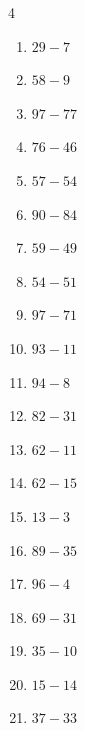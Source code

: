 \begin{multicols}{4}
\begin{enumerate}
  \item $29-7$
        \phantom{$=22$}

  \item $58-9$
        \phantom{$=49$}

\columnbreak %

\resetques

  \item $97-77$
        \phantom{$=20$}

  \item $76-46$
        \phantom{$=30$}

  \item $57-54$
        \phantom{$=3$}

  \item $90-84$
        \phantom{$=6$}

  \item $59-49$
        \phantom{$=10$}

  \item $54-51$
        \phantom{$=3$}

  \item $97-71$
        \phantom{$=26$}

  \item $93-11$
        \phantom{$=82$}

  \item $94-8$
        \phantom{$=86$}

  \item $82-31$
        \phantom{$=51$}

  \item $62-11$
        \phantom{$=51$}

  \item $62-15$
        \phantom{$=47$}

  \item $13-3$
        \phantom{$=10$}

  \item $89-35$
        \phantom{$=54$}

  \item $96-4$
        \phantom{$=92$}

  \item $69-31$
        \phantom{$=38$}

  \item $35-10$
        \phantom{$=25$}

  \item $15-14$
        \phantom{$=1$}

  \item $37-33$
        \phantom{$=4$}


\end{enumerate}
\end{multicols}
